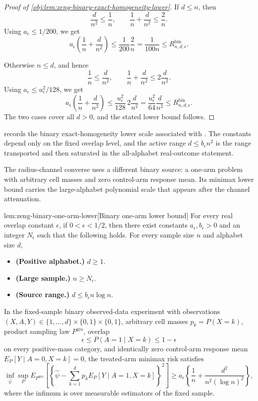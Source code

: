 \documentclass[11pt]{article}
\begin{document}
\begin{proof}[Proof of \cref{obj:lem:zeng-binary-exact-homogeneity-lower}]
If \(d\le n\), then
\[
\frac{d}{n^2}\le \frac1n,
\qquad
\frac1n+\frac{d}{n^2}\le \frac2n .
\]
Using \(a_\epsilon\le1/200\), we get
\[
a_\epsilon\left(\frac1n+\frac{d}{n^2}\right)
\le
\frac1{200}\frac2n
=
\frac1{100n}
\le
R_{n,d,\epsilon}^{\mathrm{bin}} .
\]

Otherwise \(n\le d\), and hence
\[
\frac1n\le \frac{d}{n^2},
\qquad
\frac1n+\frac{d}{n^2}\le 2\frac{d}{n^2}.
\]
Using \(a_\epsilon\le u_\epsilon^2/128\), we get
\[
a_\epsilon\left(\frac1n+\frac{d}{n^2}\right)
\le
\frac{u_\epsilon^2}{128}\,2\frac{d}{n^2}
=
\frac{u_\epsilon^2}{64}\frac{d}{n^2}
\le
R_{n,d,\epsilon}^{\mathrm{bin}} .
\]
The two cases cover all \(d>0\), and the stated lower bound follows.
\end{proof}

 records the binary exact-homogeneity lower scale associated with \citet{ZengBalakrishnanHanKennedy2024}. The constants depend only on the fixed overlap level, and the active range \(d\le b_\epsilon n^2\) is the range transported and then saturated in the all-alphabet real-outcome statement.

The radius-channel converse uses a different binary source: a one-arm problem with arbitrary cell masses and zero control-arm response mean. Its minimax lower bound carries the large-alphabet polynomial scale that appears after the channel attenuation.

\begin{lemmav}{lem:zeng-binary-one-arm-lower}[Binary one-arm lower bound]
For every real overlap constant \(\epsilon\), if \(0<\epsilon<1/2\), then there exist constants \(a_{\epsilon},b_{\epsilon}>0\) and an integer \(N_{\epsilon}\) such that the following holds.  For every sample size \(n\) and alphabet size \(d\),
\begin{itemize}
\item \textbf{(Positive alphabet.)} \(d\ge 1\).
\item \textbf{(Large sample.)} \(n\ge N_{\epsilon}\).
\item \textbf{(Source range.)} \(d\le b_{\epsilon}n\log n\).
\end{itemize}
In the fixed-sample binary observed-data experiment with observations \((X,A,Y)\in\{1,\ldots,d\}\times\{0,1\}\times\{0,1\}\), arbitrary cell masses \(p_k=P(X=k)\), product sampling law \(P^{\otimes n}\), overlap
\[
\epsilon\le P(A=1\mid X=k)\le 1-\epsilon
\]
on every positive-mass category, and identically zero control-arm response mean \(E_P[Y\mid A=0,X=k]=0\), the treated-arm minimax risk satisfies
\[
\inf_{\widehat\psi}
\sup_P
E_{P^{\otimes n}}\left[
\left\{\widehat\psi-\sum_{k=1}^d p_k E_P[Y\mid A=1,X=k]\right\}^2
\right]
\ge
a_{\epsilon}
\left\{
\frac{1}{n}
+
\frac{d^2}{n^2(\log n)^2}
\right\},
\]
where the infimum is over measurable estimators of the fixed sample.
\end{lemmav}
\end{document}
